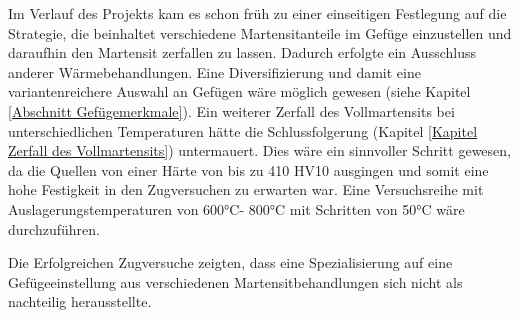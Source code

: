 \documentclass[a4paper, 11pt]{tubsreprt}
\begin{document}
Im Verlauf des Projekts kam es schon früh zu einer einseitigen Festlegung auf die Strategie, die beinhaltet verschiedene Martensitanteile im Gefüge einzustellen und daraufhin den Martensit zerfallen zu lassen. Dadurch erfolgte ein Ausschluss anderer Wärmebehandlungen. Eine Diversifizierung und damit eine variantenreichere Auswahl an Gefügen wäre möglich gewesen (siehe Kapitel \ref{Abschnitt Gefügemerkmale}). 
Ein weiterer Zerfall des Vollmartensits bei unterschiedlichen Temperaturen hätte die Schlussfolgerung (Kapitel \ref{Kapitel Zerfall des Vollmartensits}) untermauert. Dies wäre ein sinnvoller Schritt gewesen, da die Quellen von einer Härte von bis zu 410 HV10 ausgingen und somit eine hohe Festigkeit in den Zugversuchen zu erwarten war. Eine Versuchsreihe mit Auslagerungstemperaturen von 600°C- 800°C mit Schritten von 50°C wäre durchzuführen.

Die Erfolgreichen Zugversuche zeigten, dass eine Spezialisierung auf eine Gefügeeinstellung aus verschiedenen Martensitbehandlungen sich nicht als nachteilig herausstellte. 



\listoffigures
\listoftables
\end{document}
